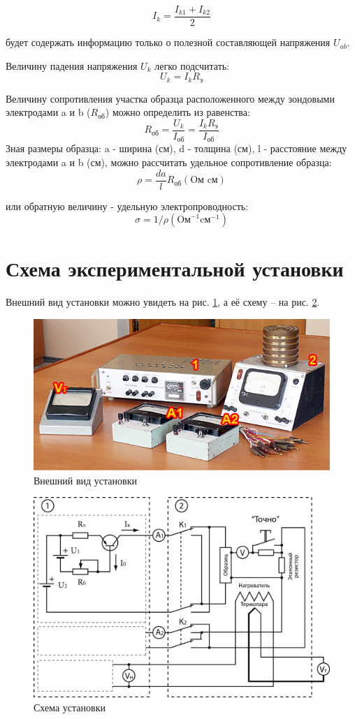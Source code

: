 $$I_k=\frac{I_{k1}+I_{k2}}{2}$$

будет содержать информацию только о полезной составляющей напряжения $U_{ab}$.

Величину падения напряжения $U_k$ легко подсчитать:
$$U_{k}=I_{k} R_{\text{э}}$$

Величину сопротивления участка образца расположенного между зондовыми электродами a и b ($R_{\text{об}}$) можно определить из равенства:
$$R_{\text{об}}=\frac{U_{k}}{I_{\text{об}}}=\frac{I_{k} R_{\text{э}}}{I_{\text{об}}}$$
Зная размеры образца: a - ширина (см), d - толщина (см), l - расстояние между электродами a и b (см), можно рассчитать удельное сопротивление образца:
$$\rho=\frac{d a}{l} R_{\text{об}} (\text{Oм} \text{ cм})$$

или обратную величину - удельную электропроводность: 
$$\sigma=1 / \rho\left(\text{Oм}^{-1} \text{cм}^{-1}\right)$$

\section{Схема экспериментальной установки}
Внешний вид установки можно увидеть на рис. \ref{fig:6.1}, а её схему – на рис. \ref{fig:6.2}. 

\begin{figure}[h!]
	\centering
	\includegraphics[width = .9\linewidth]{img/ust.jpg}
	\caption{Внешний вид установки}
	\label{fig:6.1}
\end{figure}

\begin{figure}[h!]
	\centering
	\includegraphics[width = .9\linewidth]{img/scheme-2.jpg}
	\caption{Схема установки}
	\label{fig:6.2}
\end{figure}

